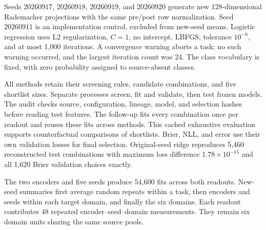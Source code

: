 Seeds $20260917$, $20260918$, $20260919$, and $20260920$ generate new 128-dimensional Rademacher projections with the same pre/post row normalization. Seed $20260911$ is an implementation control, excluded from new-seed means. Logistic regression uses L2 regularization, $C=1$, no intercept, LBFGS, tolerance $10^{-6}$, and at most 1,000 iterations. A convergence warning aborts a task; no such warning occurred, and the largest iteration count was 24. The class vocabulary is fixed, with zero probability assigned to source-absent classes.

All methods retain their screening rules, candidate combinations, and five shortlist sizes. Separate processes screen, fit and validate, then test frozen models. The audit checks source, configuration, lineage, model, and selection hashes before reading test features. The follow-up fits every combination once per readout and reuses these fits across methods. This cached exhaustive evaluation supports counterfactual comparisons of shortlists. Brier, NLL, and error use their own validation losses for final selection. Original-seed ridge reproduces 5,460 reconstructed test combinations with maximum loss difference $1.78\times10^{-15}$ and all 1,620 Brier validation choices exactly.

The two encoders and five seeds produce 54,600 fits across both readouts. New-seed summaries first average random repeats within a task, then encoders and seeds within each target domain, and finally the six domains. Each readout contributes 48 repeated encoder--seed--domain measurements. They remain six domain units sharing the same source pools.

